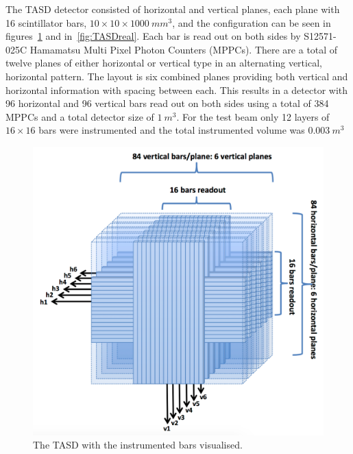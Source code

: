 The TASD detector consisted of horizontal and vertical planes, each plane with 16 scintillator bars, $10\times10\times1000~mm^3$, and the configuration can be seen in figures~\ref{fig:TASD} and in~\ref{fig:TASDreal}. Each bar is read out on both sides by S12571-025C Hamamatsu Multi Pixel Photon Counters (MPPCs). There are a total of twelve planes of either horizontal or vertical type in an alternating vertical, horizontal pattern. The layout is six combined planes providing both vertical and horizontal information with spacing between each. This results in a detector with 96 horizontal and 96 vertical bars read out on both sides using a total of 384 MPPCs and a total detector size of $1~m^3$.  For the test beam only 12 layers of $16 \times 16$ bars were instrumented and the total instrumented volume was $0.003~m^3$


\begin{figure}[h!]
\centering
\includegraphics[width=\textwidth]{figures/AIDA.png}
\caption{The TASD with the instrumented bars visualised.}
\label{fig:TASD}
\end{figure}

